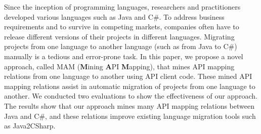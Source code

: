 Since the inception of programming languages, researchers and practitioners developed various languages such as Java and C\#. To address business requirements and to survive in competing markets,
companies often have to release different versions of their projects in different languages. Migrating projects from one language to another language (such as from Java to C\#) manually is a tedious
and error-prone task. In this paper, we propose a novel approach, called MAM (\textbf{M}ining \textbf{A}PI
\textbf{M}apping), that mines API mapping relations from one language to another using API client code. 
These mined API mapping relations assist in automatic migration of projects from one language to another. We conducted two evaluations to show the effectiveness
of our approach. The results show that our approach mines many API mapping relations between Java and C\#, and these relations improve existing language migration tools such as Java2CSharp.